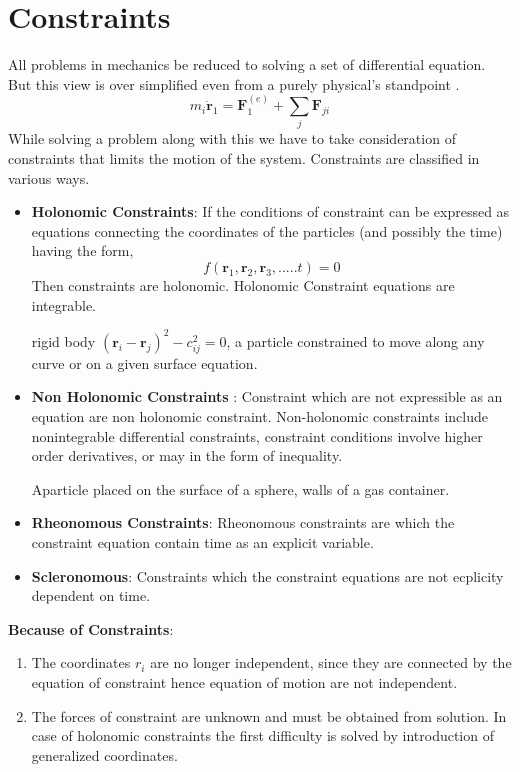 \section{Constraints}
All problems in mechanics be reduced to solving a set of differential equation. But this view is over simplified even from a purely physical's standpoint .
$$ m_i\ddot{\mathbf{r}}_1=\textbf{F}_1^{(e)}+\sum\limits_{j}\textbf{F}_{ji}$$
 While solving a problem along with this we have to take consideration of constraints that limits the motion of the system. Constraints are classified in various ways.
\begin{itemize}
\item \textbf{Holonomic Constraints}:  If the conditions of constraint can be expressed as equations connecting the coordinates of the particles (and possibly the time) having the form,
	$$ f(\textbf{r}_1,\textbf{r}_2, \textbf{r}_3,.....t)=0$$
	Then constraints are holonomic. Holonomic Constraint equations are integrable.
	\begin{example}
	rigid body $(\textbf{r}_i-\textbf{r}_j)^2-c_{ij}^2=0$,
	a particle constrained to move along any curve or on a given surface equation.
	\end{example}

\item \textbf{Non Holonomic Constraints }:
Constraint which are not expressible as an equation are non holonomic constraint. Non-holonomic constraints include nonintegrable differential constraints, constraint conditions involve higher order derivatives, or may in the form of inequality.\\
\begin{example}
	Aparticle placed on the surface of a sphere, walls of a gas container.
\end{example}
\item \textbf{Rheonomous Constraints}:
Rheonomous constraints are which the constraint equation contain time as an explicit variable.\\
\item \textbf{Scleronomous}: 
Constraints which the constraint equations are not ecplicity dependent on time.\\
\end{itemize}
\textbf{Because of Constraints}:
\begin{enumerate}
	\item The coordinates $r_i$ are no longer independent, since they are connected by the equation of constraint hence equation of motion are not independent.
	\item The forces of constraint are unknown and must be obtained from solution.
	In case of holonomic constraints the first difficulty is solved by introduction of generalized coordinates.
\end{enumerate}

